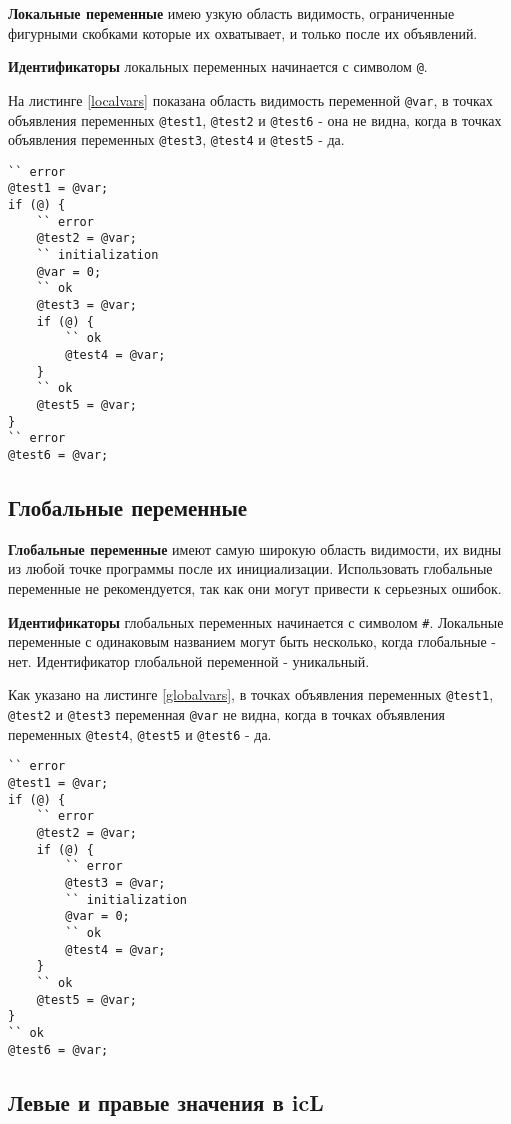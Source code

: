 \documentclass[a4paper, 14pt]{extarticle}
\begin{document}
\textbf{Локальные переменные} имею узкую область видимость, ограниченные фигурными скобками которые их охватывает, и только после их объявлений. 
	
{\bf Идентификаторы} локальных переменных начинается с символом \lstinline`@`. 
	
На листинге \ref{localvars} показана область видимость переменной \lstinline`@var`, в точках объявления переменных \lstinline`@test1`, \lstinline`@test2` и \lstinline`@test6` - она не видна, когда в точках объявления переменных \lstinline`@test3`, \lstinline`@test4` и \lstinline`@test5` - да.
\begin{lstlisting}[caption=Область видимости локальных перемен, label=localvars]
`` error
@test1 = @var;
if (@) {
	`` error
	@test2 = @var; 
	`` initialization
	@var = 0;
	`` ok
	@test3 = @var;
	if (@) {
		`` ok
		@test4 = @var;
	}
	`` ok
	@test5 = @var; 
}
`` error
@test6 = @var; 
\end{lstlisting}

\subsection{Глобальные переменные}

\textbf{Глобальные переменные} имеют самую широкую область видимости, их видны из любой точке программы после их инициализации. Использовать глобальные переменные не рекомендуется, так как они могут привести к серьезных ошибок. 
	
{\bf Идентификаторы} глобальных переменных начинается с символом {\color{blue2}\lstinline`#`}. Локальные переменные с одинаковым названием могут быть несколько, когда глобальные - нет. Идентификатор глобальной переменной - уникальный.
	
Как указано на листинге \ref{globalvars}, в точках объявления переменных \lstinline`@test1`, \lstinline`@test2` и \lstinline`@test3` переменная \lstinline`@var` не видна, когда в точках объявления переменных \lstinline`@test4`, \lstinline`@test5` и \lstinline`@test6` - да.
	
\begin{lstlisting}[caption=Область видимости глобальных перемен, label=globalvars]
`` error
@test1 = @var;
if (@) {
	`` error
	@test2 = @var; 
	if (@) {
		`` error
		@test3 = @var;
		`` initialization
		@var = 0;
		`` ok
		@test4 = @var;
	}
	`` ok
	@test5 = @var; 
}
`` ok
@test6 = @var;
\end{lstlisting}

\subsection{Левые и правые значения в icL}
\end{document}
